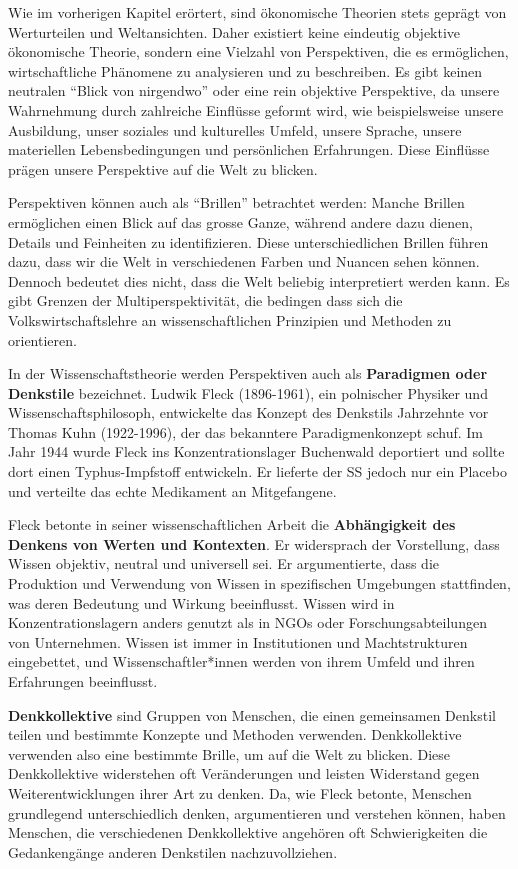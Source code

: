 \documentclass[
  nswissgerman,
  a4paper,
  DIV=11,
  numbers=noendperiod,
  oneside,
  openany]{scrreprt}
\begin{document}
Wie im vorherigen Kapitel erörtert, sind ökonomische Theorien stets
geprägt von Werturteilen und Weltansichten. Daher existiert keine
eindeutig objektive ökonomische Theorie, sondern eine Vielzahl von
Perspektiven, die es ermöglichen, wirtschaftliche Phänomene zu
analysieren und zu beschreiben. Es gibt keinen neutralen ``Blick von
nirgendwo'' oder eine rein objektive Perspektive, da unsere Wahrnehmung
durch zahlreiche Einflüsse geformt wird, wie beispielsweise unsere
Ausbildung, unser soziales und kulturelles Umfeld, unsere Sprache,
unsere materiellen Lebensbedingungen und persönlichen Erfahrungen. Diese
Einflüsse prägen unsere Perspektive auf die Welt zu blicken.

Perspektiven können auch als ``Brillen'' betrachtet werden: Manche
Brillen ermöglichen einen Blick auf das grosse Ganze, während andere
dazu dienen, Details und Feinheiten zu identifizieren. Diese
unterschiedlichen Brillen führen dazu, dass wir die Welt in
verschiedenen Farben und Nuancen sehen können. Dennoch bedeutet dies
nicht, dass die Welt beliebig interpretiert werden kann. Es gibt Grenzen
der Multiperspektivität, die bedingen dass sich die
Volkswirtschaftslehre an wissenschaftlichen Prinzipien und Methoden zu
orientieren.

In der Wissenschaftstheorie werden Perspektiven auch als
\textbf{Paradigmen oder Denkstile} bezeichnet. Ludwik Fleck (1896-1961),
ein polnischer Physiker und Wissenschaftsphilosoph, entwickelte das
Konzept des Denkstils Jahrzehnte vor Thomas Kuhn (1922-1996), der das
bekanntere Paradigmenkonzept schuf. Im Jahr 1944 wurde Fleck ins
Konzentrationslager Buchenwald deportiert und sollte dort einen
Typhus-Impfstoff entwickeln. Er lieferte der SS jedoch nur ein Placebo
und verteilte das echte Medikament an Mitgefangene.

Fleck betonte in seiner wissenschaftlichen Arbeit die
\textbf{Abhängigkeit des Denkens von Werten und Kontexten}. Er
widersprach der Vorstellung, dass Wissen objektiv, neutral und
universell sei. Er argumentierte, dass die Produktion und Verwendung von
Wissen in spezifischen Umgebungen stattfinden, was deren Bedeutung und
Wirkung beeinflusst. Wissen wird in Konzentrationslagern anders genutzt
als in NGOs oder Forschungsabteilungen von Unternehmen. Wissen ist immer
in Institutionen und Machtstrukturen eingebettet, und
Wissenschaftler*innen werden von ihrem Umfeld und ihren Erfahrungen
beeinflusst.

\textbf{Denkkollektive} sind Gruppen von Menschen, die einen gemeinsamen
Denkstil teilen und bestimmte Konzepte und Methoden verwenden.
Denkkollektive verwenden also eine bestimmte Brille, um auf die Welt zu
blicken. Diese Denkkollektive widerstehen oft Veränderungen und leisten
Widerstand gegen Weiterentwicklungen ihrer Art zu denken. Da, wie Fleck
betonte, Menschen grundlegend unterschiedlich denken, argumentieren und
verstehen können, haben Menschen, die verschiedenen Denkkollektive
angehören oft Schwierigkeiten die Gedankengänge anderen Denkstilen
nachzuvollziehen.
\end{document}
